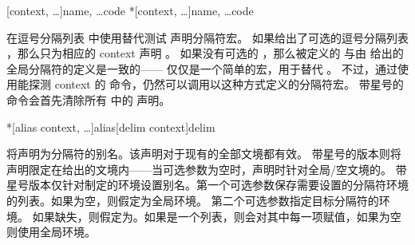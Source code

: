 \begin{ltxsyntax}
[context, \dots]{name, \dots}{code}
*[context, \dots]{name, \dots}{code}


在逗号分隔列表  中使用替代测试  声明分隔符宏。
如果给出了可选的逗号分隔列表 ，那么只为相应的 context 声明 。
如果没有可选的 ，那么被定义的  与由  给出的全局分隔符的定义是一致的——
仅仅是一个简单的宏，用于替代 。
不过，通过使用能探测 context 的  命令，仍然可以调用以这种方式定义的分隔符宏。
带星号的命令会首先清除所有  中的  声明。

*[alias context, \dots]{alias}[delim context]{delim}




将声明为分隔符的别名。该声明对于现有的全部文境都有效。
带星号的版本则将声明限定在给出的文境内——当可选参数为空时，声明时针对全局/空文境的。
带星号版本仅针对制定的环境设置别名。第一个可选参数保存需要设置的分隔符环境的列表。如果为空，则假定为全局环境。
第二个可选参数指定目标分隔符的环境。
如果缺失，则假定为。如果是一个列表，则会对其中每一项赋值，如果为空则使用全局环境。




\end{ltxsyntax}
